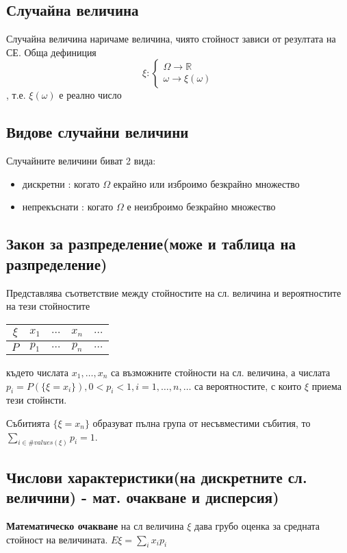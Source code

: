 \documentclass[fleqn,12pt]{article}
\begin{document}
\begin{justify}
\subsection{Случайна величина}
Случайна величина наричаме величина, чиято стойност зависи от резултата на СЕ. Обща дефиниция
\[\xi : \begin{cases}
    \Omega \rightarrow \mathbb{R}\\
    \omega \rightarrow \xi(\omega)
\end{cases} \], т.е. $\xi(\omega)$ е реално число
\subsection{Видове случайни величини}
Случайните величини биват 2 вида:
\begin{itemize}
    \item дискретни : когато $\Omega$ екрайно или изброимо безкрайно множество
    \item непрекъснати : когато $\Omega$ е неизброимо безкрайно множество
\end{itemize}
\subsection{Закон за разпределение(може и таблица на разпределение)}
Представлява съответствие между стойностите на сл. величина и вероятностите на тези стойностите

\begin{tabular}{|c|c|c|c|c|}
    \hline
    $\xi$ & $x_1$ & $\dots$ & $x_n$ & $\dots$ \\
    \hline
    $P$ & $p_1$ & $\dots$ & $p_n$ & $\dots$ \\
    \hline
\end{tabular}

където числата $x_1,\dots,x_n$ са възможните стойности на сл. величина, а числата 
$p_i=P(\{\xi = x_i\}), 0 < p_i < 1, i=1,\dots,n,\dots$ са вероятностите, с които $\xi$ приема тези стойнсти. 

Събитията $\{\xi = x_n\}$ образуват пълна група от несъвместими събития, то $\sum_{i \in \#values(\xi)} p_i = 1$.

\subsection{Числови характеристики(на дискретните сл. величини) - мат. очакване и дисперсия)}
\textbf{Математическо очакване} на сл величина $\xi$ дава грубо оценка за средната стойност на величината.
$E\xi = \sum_i x_i p_i$


\end{justify}
\end{document}
